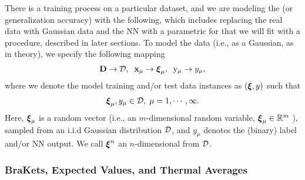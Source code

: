 There is a training process on a particular dataset, and we are modeling the \Quality (or generalization accuracy)
with the following, which includes replacing the real data with Gaussian data and
the NN with a parametric for that we will fit with a \SemiEmpirical procedure, described in later sections.
To model the data (i.e., as a Gaussian, as in \SMOG theory), we specify the following mapping
\begin{align}
\label{eqn:model_real_world_expt}
  \mathbf{D} \rightarrow \mathcal{D},\;\;{\mathbf{x}}_{\mu} \rightarrow \boldsymbol{\xi}_{\mu},\;\;  \mathrm{y}_{\mu} \rightarrow y_{\mu}  ,
\end{align}
where we denote the model training and/or test data instances as $(\boldsymbol{\xi},y)$ such that
\begin{align}
    \label{eqn:xi}
  \boldsymbol{\xi}_{\mu}, y_{\mu} \in\mathcal{D},\;\mu=1, \cdots, \infty  .
\end{align}
Here,  $\boldsymbol{\xi}_{\mu}$ is a random vector (i.e., an $m$-dimensional random variable, $\boldsymbol{\xi}_{\mu}\in\mathbb{R}^{m}$ ),
sampled from an i.i.d Gaussian distribution $\mathcal{D}$,
and $y_{\mu}$ denotes the (binary) label and/or NN output.
We call $\boldsymbol{\xi}^{n}$ an $n$-dimensional \emph{\ModelSample} from $\mathcal{D}$.

\subsubsection{BraKets, Expected Values, and Thermal Averages}
\label{sxn:mathP_averages}

